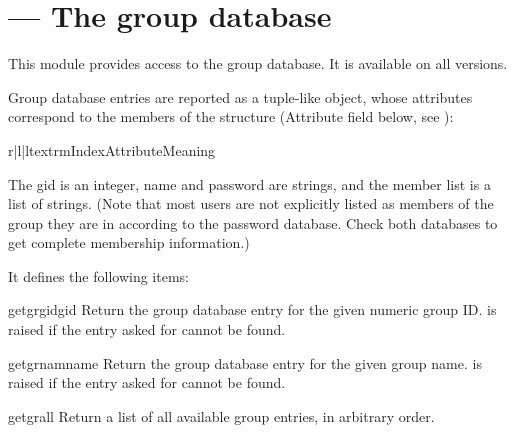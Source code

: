 \section{ ---
         The group database}



This module provides access to the \UNIX{} group database.
It is available on all \UNIX{} versions.

Group database entries are reported as a tuple-like object, whose
attributes correspond to the members of the  structure
(Attribute field below, see ):

\begin{tableiii}{r|l|l}{textrm}{Index}{Attribute}{Meaning}
\end{tableiii}

The gid is an integer, name and password are strings, and the member
list is a list of strings.
(Note that most users are not explicitly listed as members of the
group they are in according to the password database.  Check both
databases to get complete membership information.)

It defines the following items:

\begin{funcdesc}{getgrgid}{gid}
Return the group database entry for the given numeric group ID.
 is raised if the entry asked for cannot be found.
\end{funcdesc}

\begin{funcdesc}{getgrnam}{name}
Return the group database entry for the given group name.
 is raised if the entry asked for cannot be found.
\end{funcdesc}

\begin{funcdesc}{getgrall}{}
Return a list of all available group entries, in arbitrary order.
\end{funcdesc}


\begin{seealso}
\end{seealso}
